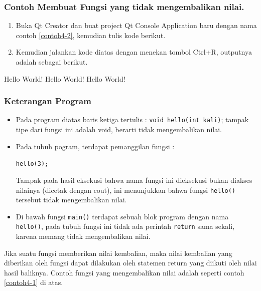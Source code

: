 \subsubsection*{Contoh  Membuat Fungsi yang tidak mengembalikan nilai.}

\begin{enumerate}

\item
  Buka Qt Creator dan buat project Qt Console Application baru dengan
  nama contoh \ref{contoh4-2}, kemudian tulis kode berikut.



\item
  Kemudian jalankan kode diatas dengan menekan tombol Ctrl+R, outputnya
  adalah sebagai berikut.
\end{enumerate}
\begin{lcverbatim}
Hello World!
Hello World!
Hello World!
\end{lcverbatim}


\subsubsection*{Keterangan Program}

\begin{itemize}
\item
  Pada program diatas baris ketiga tertulis :
  \texttt{void\ hello(int\ kali)}; tampak tipe dari fungsi ini adalah
  void, berarti tidak mengembalikan nilai.
\item
  Pada tubuh pogram, terdapat pemanggilan fungsi :


\texttt{hello(3);}

Tampak pada hasil eksekusi bahwa nama fungsi ini dieksekusi bukan
diakses nilainya (dicetak dengan cout), ini menunjukkan bahwa fungsi
\texttt{hello()} tersebut tidak mengembalikan nilai.


\item
  Di bawah fungsi \texttt{main()} terdapat sebuah blok program dengan
  nama \texttt{hello()}, pada tubuh fungsi ini tidak ada perintah
  \texttt{return} sama sekali, karena memang tidak mengembalikan nilai.
\end{itemize}

Jika suatu fungsi memberikan nilai kembalian, maka nilai kembalian yang
diberikan oleh fungsi dapat dilakukan oleh statemen return yang diikuti
oleh nilai hasil baliknya. Contoh fungsi yang mengembalikan nilai adalah
seperti contoh \ref{contoh4-1} di atas.

